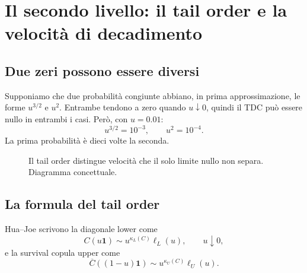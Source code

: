 \documentclass[11pt,a4paper]{article}
\newcommand{\one}{\boldsymbol{1}}
\begin{document}
\section{Il secondo livello: il tail order e la velocità di decadimento}

\subsection{Due zeri possono essere diversi}

Supponiamo che due probabilità congiunte abbiano, in prima approssimazione, le
forme $u^{3/2}$ e $u^2$. Entrambe tendono a zero quando $u\downarrow0$, quindi
il TDC può essere nullo in entrambi i casi. Però, con $u=0.01$:
\[
 u^{3/2}=10^{-3},\qquad u^2=10^{-4}.
\]
La prima probabilità è dieci volte la seconda.

\begin{figure}[ht]
\centering
{}
\caption{Il tail order distingue velocità che il solo limite nullo non separa. Diagramma concettuale.}
\label{fig:orders-curves}
\end{figure}

\subsection{La formula del tail order}

Hua--Joe scrivono la diagonale lower come
\begin{equation}
 C(u\one)\sim u^{\kappa_L(C)}\ell_L(u),
 \qquad u\downarrow0,
 \label{eq:tail-order-lower}
\end{equation}
e la survival copula upper come
\begin{equation}
 \overline C((1-u)\one)\sim u^{\kappa_U(C)}\ell_U(u).
 \label{eq:tail-order-upper}
\end{equation}
\end{document}
